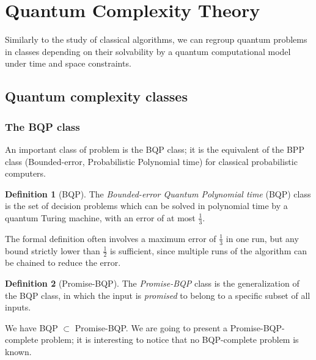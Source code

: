 \documentclass[12pt,a4paper]{article}
\theoremstyle{plain}
\theoremstyle{definition}
\newtheorem*{definition}{Definition}
\begin{document}
\section{Quantum Complexity Theory}
Similarly to the study of classical algorithms, we can regroup quantum problems in classes depending on their solvability by a quantum computational model under time and space constraints. 

\subsection{Quantum complexity classes}
\subsubsection{The BQP class}
An important class of problem is the BQP class; it is the equivalent of the BPP class (Bounded-error, Probabilistic Polynomial time) for classical probabilistic computers.

\begin{definition}[BQP] 
    The \emph{Bounded-error Quantum Polynomial time} (BQP) class is the set of decision problems which can be solved in polynomial time by a quantum Turing machine, with an error of at most $\frac{1}{3}$. 
\end{definition}
The formal definition often involves a maximum error of $\frac{1}{3}$ in one run, but any bound strictly lower than $\frac{1}{2}$ is sufficient, since multiple runs of the algorithm can be chained to reduce the error.

\begin{definition}[Promise-BQP]
    The \emph{Promise-BQP} class is the generalization of the BQP class, in which the input is \emph{promised} to belong to a specific subset of all inputs.
\end{definition}

We have BQP $\subset$ Promise-BQP. We are going to present a Promise-BQP-complete problem; it is interesting to notice that no BQP-complete problem is known.
\end{document}
